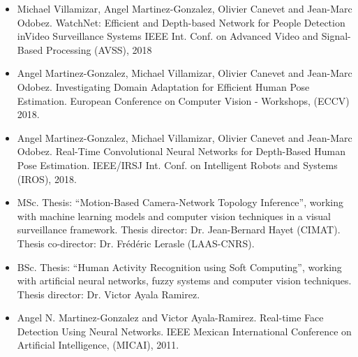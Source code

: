 \documentclass[10 pt]{article}
\begin{document}
\begin{itemize}[noitemsep]


\item Michael Villamizar, Angel Martinez-Gonzalez, Olivier Canevet and Jean-Marc Odobez.
WatchNet: Efficient and Depth-based Network for People Detection inVideo Surveillance Systems
IEEE Int. Conf. on Advanced Video and Signal-Based Processing (AVSS), 2018
\vspace{.05cm}
%

\item  Angel Martinez-Gonzalez, Michael Villamizar, Olivier Canevet and Jean-Marc Odobez.
Investigating Domain Adaptation for Efficient Human Pose Estimation.
European Conference on Computer Vision - Workshops, (ECCV) 2018.
\vspace{.05cm}

\item Angel Martinez-Gonzalez, Michael Villamizar, Olivier Canevet and Jean-Marc Odobez.
Real-Time Convolutional Neural Networks for Depth-Based Human Pose Estimation.
IEEE/IRSJ Int. Conf. on Intelligent Robots and Systems (IROS), 2018.
\vspace{.05cm}

\item MSc. Thesis: “Motion-Based Camera-Network Topology Inference”, working with machine learning models and computer 
vision techniques in a visual surveillance framework. Thesis director: Dr. Jean-Bernard Hayet (CIMAT). 
Thesis co-director: Dr. Frédéric Lerasle (LAAS-CNRS).
\vspace{.05cm}

\item BSc. Thesis: “Human Activity Recognition using Soft Computing”, working with artificial neural networks, 
fuzzy systems and computer vision techniques. Thesis director: Dr. Victor Ayala Ramirez.
\vspace{.05cm}

\item Angel N. Martinez-Gonzalez and Victor Ayala-Ramirez. Real-time Face Detection Using Neural Networks. 
IEEE Mexican International Conference on Artificial Intelligence, (MICAI), 2011.
\vspace{.05cm}

\end{itemize}
%
%
\end{document}
